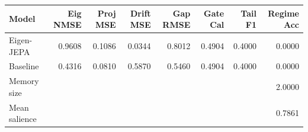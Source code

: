 \begin{tabular}{lrrrrrrr}
\toprule
Model & Eig NMSE & Proj MSE & Drift MSE & Gap RMSE & Gate Cal & Tail F1 & Regime Acc \\
\midrule
Eigen-JEPA & 0.9608 & 0.1086 & 0.0344 & 0.8012 & 0.4904 & 0.4000 & 0.0000 \\
Baseline & 0.4316 & 0.0810 & 0.5870 & 0.5460 & 0.4904 & 0.4000 & 0.0000 \\
\midrule
Memory size & \multicolumn{7}{r}{2.0000} \\
Mean salience & \multicolumn{7}{r}{0.7861} \\
\bottomrule
\end{tabular}